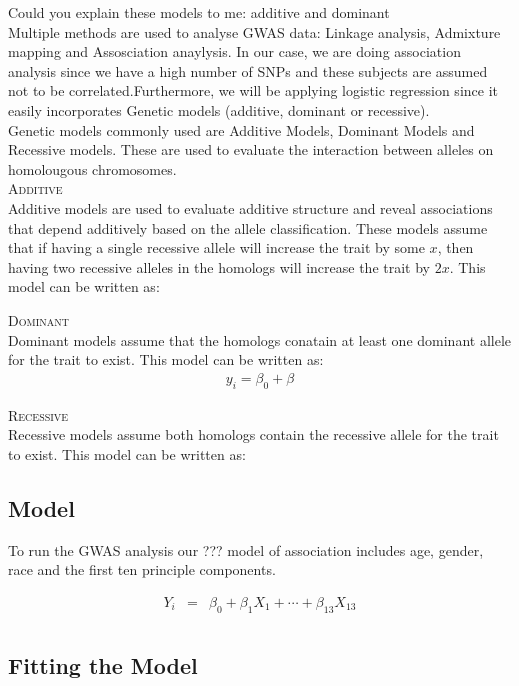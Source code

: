 \documentclass[11pt]{article}\usepackage[]{graphicx}\usepackage[]{color}
\begin{document}
Could you explain these models to me: additive and dominant\\

Multiple methods are used to analyse GWAS data: Linkage analysis, Admixture mapping and Assosciation anaylysis. In our case, we are doing association analysis since we have a high number of SNPs and these subjects are assumed not to be correlated.Furthermore, we will be applying logistic regression since it easily incorporates Genetic models (additive, dominant or recessive).\\

Genetic models commonly used are Additive Models, Dominant Models and Recessive models. These are used to evaluate the interaction between alleles on homolougous chromosomes. \\

\textsc{Additive}\\
Additive models are used to evaluate additive structure and reveal associations that depend additively based on the allele classification. These models assume that if having a single recessive allele will increase the trait by some $x$, 
then having two recessive alleles in the homologs will increase the trait by $2x$. This model can be written as:

\textsc{Dominant}\\
Dominant models assume that the homologs conatain at least one dominant allele for the trait to exist. This model can be written as:
\begin{eqnarray}
y_{i} = \beta_0 + \beta
\end{eqnarray}

\textsc{Recessive}\\
Recessive models assume both homologs contain the recessive allele for the trait to exist. This model can be written as:

\subsection{Model}

To run the GWAS analysis our ??? model of association includes age, gender, race and the first ten principle components.

\begin{eqnarray}
Y_i &=& \beta_0 + \beta_1 X_1 + \cdots + \beta_{13} X_{13} \\
\end{eqnarray}

\subsection{Fitting the Model}
\end{document}
